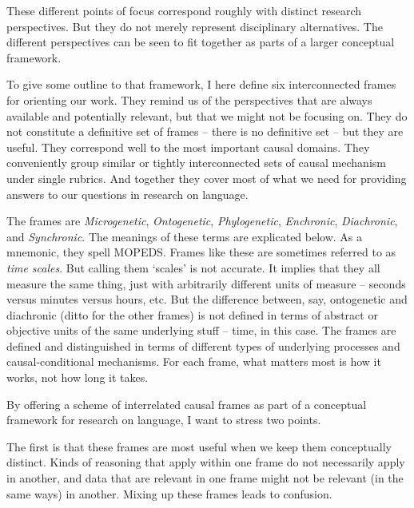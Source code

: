 These different points of focus correspond roughly with distinct research 
perspectives. But they do not merely represent disciplinary 
alternatives. The different perspectives can be seen to 
fit together as parts of a larger conceptual framework. 



To give some outline to that framework, I here define six interconnected frames for orienting our work. They remind us of the 
perspectives that are always available and potentially relevant, but that we might 
not be focusing on. They do not constitute a definitive set of 
frames -- there is no definitive set -- but they are useful. They correspond 
well to the most important causal domains. They conveniently group 
similar or tightly interconnected sets of causal mechanism under single 
rubrics. And together they cover most of what we need for providing 
answers to our questions in research on language. 


The frames are \textit{Microgenetic}, \textit{Ontogenetic}, 
\textit{Phylogenetic}, \textit{Enchronic}, \textit{Diachronic}, 
and \textit{Synchronic}. The meanings of these terms are explicated below. As a mnemonic, they spell MOPEDS. Frames like these are sometimes referred to as \textit{time scales}. But calling them `scales' is not accurate. It implies that they all measure the same thing, just with arbitrarily different units of measure -- seconds versus minutes versus hours, etc. But the difference between, say, ontogenetic and diachronic (ditto for the other frames) is not defined in terms of abstract or objective units of the same underlying stuff -- time, in this case. The frames are defined and distinguished in 
terms of different types of underlying processes and 
causal-conditional mechanisms. For each frame, what 
matters most is how it works, not how long it takes. 



By offering a scheme of interrelated causal frames as part of a conceptual 
framework for research on language, I want to stress two points. 



The first is that these frames are most useful when we keep them 
conceptually distinct. Kinds of reasoning that apply within one frame do 
not necessarily apply in another, and data that are relevant in one 
frame might not be relevant (in the same ways) in another. Mixing up these frames leads to confusion. 



